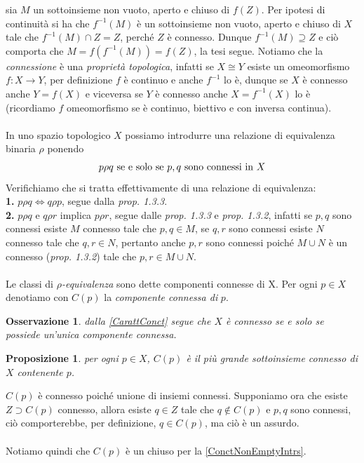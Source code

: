 \documentclass[oneside, 11pt]{amsbook}
\makeatletter
\newcommand{\0}{{(0)}}
\newcommand{\3}{{(3)}}
\theoremstyle{colonplain}
\newtheorem{prop}[thm]{Proposizione}
\theoremstyle{colondefinition}
\theoremstyle{colonremark}
\newtheorem{rmk}[thm]{Osservazione}
\numberwithin{equation}{chapter}
\renewcommand{\proofname}{Dimostrazione}
\renewenvironment{proof}[1][\proofname]{\par
  \pushQED{\qed}%
  \normalfont \topsep6\p@\@plus6\p@\relax
  \trivlist
  \item[\hskip\labelsep\bfseries #1:]\ignorespaces
}{%
  \popQED\endtrivlist\@endpefalse
}
\makeatother
\begin{document}
\begin{proof}
sia $M$ un sottoinsieme non vuoto, aperto e chiuso di $f(Z)$. Per ipotesi di continuità si ha che $f^{-1}(M)$ è un sottoinsieme non vuoto, aperto e chiuso di $X$ tale che $f^{-1}(M) \cap Z = Z$, perché $Z$ è connesso. Dunque $f^{-1}(M) \supseteq Z$ e ciò comporta che $M = f(f^{-1}(M)) = f(Z)$, la tesi segue.
\end{proof}
Notiamo che la \textit{connessione} è una \textit{proprietà topologica}, infatti se $X \cong Y$ esiste un omeomorfismo $f : X \longrightarrow Y$, per definizione $f$ è continuo e anche $f^{-1}$ lo è, dunque se $X$ è connesso anche $Y = f(X)$ e viceversa se $Y$ è connesso anche $X = f^{-1}(X)$ lo è (ricordiamo $f$ omeomorfismo se è continuo, biettivo e con inversa continua). \\ \\
In uno spazio topologico $X$ possiamo introdurre una relazione di equivalenza binaria $\rho$ ponendo
\begin{align}
    p \rho q \text{ se e solo se } p,q \text{ sono connessi in } X \notag
\end{align}
Verifichiamo che si tratta effettivamente di una relazione di equivalenza: \\
\textbf{1.} $p \rho q \iff q \rho p$, segue dalla \textit{prop. 1.3.3}. \\
\textbf{2.} $p \rho q$ e $q \rho r$ implica $p \rho r$, segue dalle \textit{prop. 1.3.3} e \textit{prop. 1.3.2}, infatti se $p, q$ sono connessi esiste $M$ connesso tale che $p, q \in M$, se $q, r$ sono connessi esiste $N$ connesso tale che $q, r \in N$, pertanto anche $p, r$ sono connessi poiché $M \cup N$ è un connesso (\textit{prop. 1.3.2}) tale che $p, r \in M \cup N$. \\ \\
Le classi di $\rho$\textit{-equivalenza} sono dette componenti connesse di X. Per ogni $p \in X$ denotiamo con $C(p)$ la \textit{componente connessa di} $p$.
\begin{rmk}
dalla \cref{CarattConct} segue che $X$ è connesso se e solo se possiede un'unica componente connessa.
\end{rmk}
\begin{prop}\label{ConctComponent}
per ogni $p \in X$, $C(p)$ è il più grande sottoinsieme connesso di $X$ contenente $p$.
\end{prop}
\begin{proof}
$C(p)$ è connesso poiché unione di insiemi connessi. Supponiamo ora che esiste $Z \supset C(p)$ connesso, allora esiste $q \in Z$ tale che $q \not\in C(p)$ e $p, q$ sono connessi, ciò comporterebbe, per definizione, $q \in C(p)$, ma ciò è un assurdo. \\ \\
Notiamo quindi che $C(p)$ è un chiuso per la \ref{ConctNonEmptyIntrs}.
\end{proof}
\end{document}
